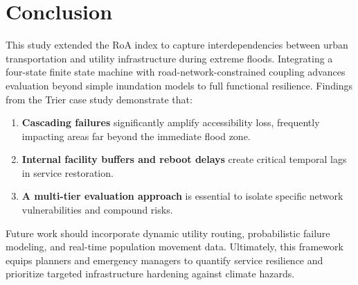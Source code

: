 
\newpage

\section{Conclusion}
\label{sec:conclusion}


This study extended the RoA index to capture interdependencies between urban transportation and utility infrastructure during extreme floods.
Integrating a four-state finite state machine with road-network-constrained coupling advances evaluation beyond simple inundation models to full functional resilience.
Findings from the Trier case study demonstrate that:
\begin{enumerate}
    \item \textbf{Cascading failures} significantly amplify accessibility loss, frequently impacting areas far beyond the immediate flood zone.
    \item \textbf{Internal facility buffers and reboot delays} create critical temporal lags in service restoration.
    \item \textbf{A multi-tier evaluation approach} is essential to isolate specific network vulnerabilities and compound risks.
\end{enumerate}

\noindent
Future work should incorporate dynamic utility routing, probabilistic failure modeling, and real-time population movement data.
Ultimately, this framework equips planners and emergency managers to quantify service resilience and prioritize targeted infrastructure hardening against climate hazards.